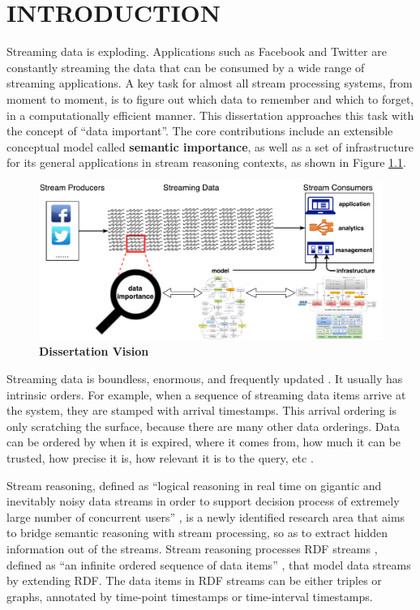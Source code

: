 \chapter{INTRODUCTION}
Streaming data is exploding. 
Applications such as Facebook and Twitter are constantly streaming the data that can be consumed by a wide range of streaming applications.
A key task for almost all stream processing systems, from moment to moment, is to figure out which data to remember and which to forget, in a computationally efficient manner. 
This dissertation approaches this task with the concept of ``data important''.
The core contributions include an extensible conceptual model called \textbf{semantic importance}, as well as a set of infrastructure for its general applications in stream reasoning contexts, as shown in Figure \ref{fig:1-tv}.

\begin{figure}[!htbp]
	\centering
    \includegraphics[width=5in]{img/1-tv.pdf}
    \caption{\textbf{Dissertation Vision}}
    \label{fig:1-tv}
\end{figure}

Streaming data is boundless, enormous, and frequently updated \cite{rodriguez2009semantic}.
It usually has intrinsic orders. 
For example, when a sequence of streaming data items arrive at the system, they are stamped with arrival timestamps.
This arrival ordering is only scratching the surface, because there are many other data orderings. 
Data can be ordered by when it is expired, where it comes from, how much it can be trusted, how precise it is, how relevant it is to the query, etc \cite{della2013order}. 

Stream reasoning, defined as ``logical reasoning in real time on gigantic and inevitably noisy data streams in order to support decision process of extremely large number of concurrent users'' \cite{barbieri2010stream}, is a newly identified research area that aims to bridge semantic reasoning with stream processing, so as to extract hidden information out of the streams.
Stream reasoning processes RDF streams \cite{barbieri2010querying}, defined as ``an infinite ordered sequence of data items'' \cite{srtutorial}, that model data streams by extending RDF.
The data items in RDF streams can be either triples or graphs, annotated by time-point timestamps or time-interval timestamps.

